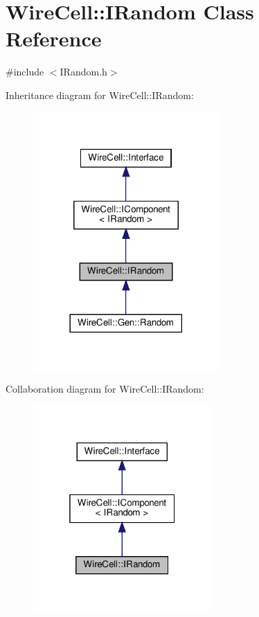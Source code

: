\hypertarget{class_wire_cell_1_1_i_random}{}\section{Wire\+Cell\+:\+:I\+Random Class Reference}
\label{class_wire_cell_1_1_i_random}


{\ttfamily \#include $<$I\+Random.\+h$>$}



Inheritance diagram for Wire\+Cell\+:\+:I\+Random\+:
\nopagebreak
\begin{figure}[H]
\begin{center}
\leavevmode
\includegraphics[width=201pt]{class_wire_cell_1_1_i_random__inherit__graph}
\end{center}
\end{figure}


Collaboration diagram for Wire\+Cell\+:\+:I\+Random\+:
\nopagebreak
\begin{figure}[H]
\begin{center}
\leavevmode
\includegraphics[width=193pt]{class_wire_cell_1_1_i_random__coll__graph}
\end{center}
\end{figure}

